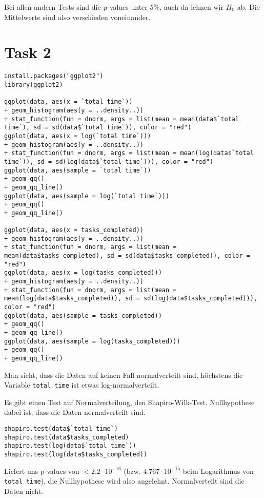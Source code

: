 \documentclass{article}
\begin{document}
	Bei allen andern Tests sind die p-values unter 5\%, auch da lehnen wir $H_0$ ab. Die Mittelwerte sind also verschieden voneinander.

	\section*{Task 2}
	\begin{lstlisting}
install.packages("ggplot2")
library(ggplot2)

ggplot(data, aes(x = `total time`)) 
+ geom_histogram(aes(y = ..density..)) 
+ stat_function(fun = dnorm, args = list(mean = mean(data$`total time`), sd = sd(data$`total time`)), color = "red")
ggplot(data, aes(x = log(`total time`))) 
+ geom_histogram(aes(y = ..density..)) 
+ stat_function(fun = dnorm, args = list(mean = mean(log(data$`total time`)), sd = sd(log(data$`total time`))), color = "red")
ggplot(data, aes(sample = `total time`)) 
+ geom_qq() 
+ geom_qq_line()
ggplot(data, aes(sample = log(`total time`))) 
+ geom_qq() 
+ geom_qq_line()

ggplot(data, aes(x = tasks_completed)) 
+ geom_histogram(aes(y = ..density..)) 
+ stat_function(fun = dnorm, args = list(mean = mean(data$tasks_completed), sd = sd(data$tasks_completed)), color = "red")
ggplot(data, aes(x = log(tasks_completed))) 
+ geom_histogram(aes(y = ..density..)) 
+ stat_function(fun = dnorm, args = list(mean = mean(log(data$tasks_completed)), sd = sd(log(data$tasks_completed))), color = "red")
ggplot(data, aes(sample = tasks_completed)) 
+ geom_qq() 
+ geom_qq_line()
ggplot(data, aes(sample = log(tasks_completed))) 
+ geom_qq() 
+ geom_qq_line()
	\end{lstlisting}
	Man sieht, dass die Daten auf keinen Fall normalverteilt sind, höchstens die Variable \texttt{total time} ist etwas log-normalverteilt.
	
	Es gibt einen Test auf Normalverteilung, den Shapiro-Wilk-Test. Nullhypothese dabei ist, dass die Daten normalverteilt sind.
	\begin{lstlisting}
shapiro.test(data$`total time`)
shapiro.test(data$tasks_completed)
shapiro.test(log(data$`total time`))
shapiro.test(log(data$tasks_completed))
	\end{lstlisting}
	Liefert uns p-values von $<2.2\cdot 10^{-16}$ (bzw. $4.767\cdot 10^{-15}$ beim Logarithmus von \texttt{total time}), die Nullhypothese wird also angelehnt. Normalverteilt sind die Daten nicht.
	
\end{document}
